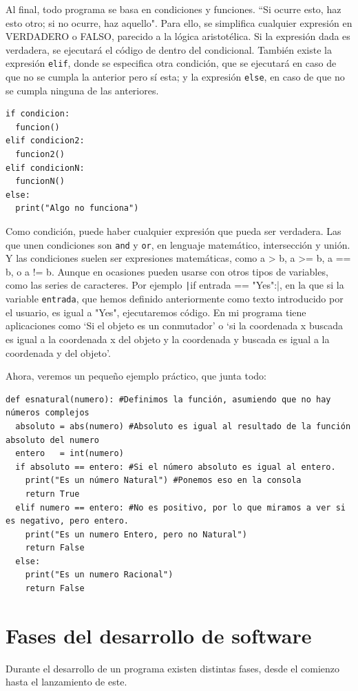 \documentclass[a4paper, 11pt]{report} %
\begin{document}
Al final, todo programa se basa en condiciones y funciones. ``Si ocurre esto, haz esto otro; si no ocurre, haz aquello". Para ello, se simplifica cualquier expresión en VERDADERO o FALSO, parecido a la lógica aristotélica. Si la expresión dada es verdadera, se ejecutará el código de dentro del condicional. También existe la expresión \texttt{elif}, donde se especifica otra condición, que se ejecutará en caso de que no se cumpla la anterior pero sí esta; y la expresión \texttt{else}, en caso de que no se cumpla ninguna de las anteriores.

\newpage
\begin{verbatim}
if condicion:
  funcion()
elif condicion2:
  funcion2()
elif condicionN:
  funcionN()
else:
  print("Algo no funciona")
\end{verbatim}
Como condición, puede haber cualquier expresión que pueda ser verdadera. Las que unen condiciones son \texttt{and} y \texttt{or}, en lenguaje matemático, intersección y unión. Y las condiciones suelen ser expresiones matemáticas, como a > b, a >= b, a == b, o a != b. Aunque en ocasiones pueden usarse con otros tipos de variables, como las series de caracteres. Por ejemplo \texttt|if entrada == "Yes":|, en la que si la variable \texttt{entrada}, que hemos definido anteriormente como texto introducido por el usuario, es igual a "Yes", ejecutaremos código. En mi programa tiene aplicaciones como `Si el objeto es un conmutador' o `si la coordenada x buscada es igual a la coordenada x del objeto y la coordenada y buscada es igual a la coordenada y del objeto'.

Ahora, veremos un pequeño ejemplo práctico, que junta todo:
\begin{verbatim}
def esnatural(numero): #Definimos la función, asumiendo que no hay números complejos
  absoluto = abs(numero) #Absoluto es igual al resultado de la función absoluto del numero
  entero   = int(numero) 
  if absoluto == entero: #Si el número absoluto es igual al entero.
    print("Es un número Natural") #Ponemos eso en la consola
    return True
  elif numero == entero: #No es positivo, por lo que miramos a ver si es negativo, pero entero.
    print("Es un numero Entero, pero no Natural")
    return False
  else:
    print("Es un numero Racional")
    return False
\end{verbatim}

\newpage
\section{Fases del desarrollo de software}
Durante el desarrollo de un programa existen distintas fases, desde el comienzo hasta el lanzamiento de este.
\end{document}
